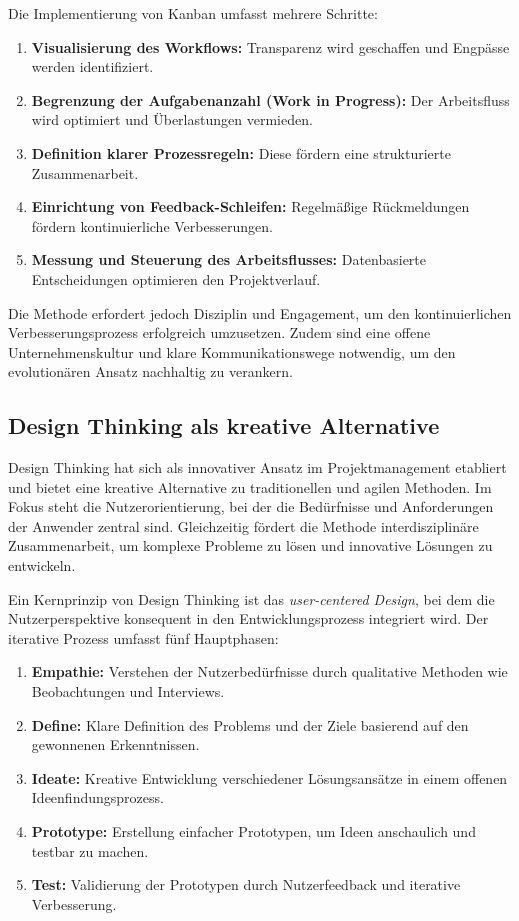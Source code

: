 \documentclass[ngerman]{seminarvorlage}
\begin{document}
Die Implementierung von Kanban umfasst mehrere Schritte:
\begin{enumerate}
    \item \textbf{Visualisierung des Workflows:} Transparenz wird geschaffen und Engpässe werden identifiziert.
    \item \textbf{Begrenzung der Aufgabenanzahl (Work in Progress):} Der Arbeitsfluss wird optimiert und Überlastungen vermieden.
    \item \textbf{Definition klarer Prozessregeln:} Diese fördern eine strukturierte Zusammenarbeit.
    \item \textbf{Einrichtung von Feedback-Schleifen:} Regelmä\ss{}ige Rückmeldungen fördern kontinuierliche Verbesserungen.
    \item \textbf{Messung und Steuerung des Arbeitsflusses:} Datenbasierte Entscheidungen optimieren den Projektverlauf.
\end{enumerate}

Die Methode erfordert jedoch Disziplin und Engagement, um den kontinuierlichen Verbesserungsprozess erfolgreich umzusetzen. Zudem sind eine offene Unternehmenskultur und klare Kommunikationswege notwendig, um den evolutionären Ansatz nachhaltig zu verankern.
\cite{schonfeld_warum_2024, bmi_kanban_2020}

\subsection{Design Thinking als kreative Alternative}  
Design Thinking hat sich als innovativer Ansatz im Projektmanagement etabliert und bietet eine kreative Alternative zu traditionellen und agilen Methoden. Im Fokus steht die Nutzerorientierung, bei der die Bedürfnisse und Anforderungen der Anwender zentral sind. Gleichzeitig fördert die Methode interdisziplinäre Zusammenarbeit, um komplexe Probleme zu lösen und innovative Lösungen zu entwickeln.  

Ein Kernprinzip von Design Thinking ist das \textit{user-centered Design}, bei dem die Nutzerperspektive konsequent in den Entwicklungsprozess integriert wird. Der iterative Prozess umfasst fünf Hauptphasen:  

\begin{enumerate}  
    \item \textbf{Empathie:} Verstehen der Nutzerbedürfnisse durch qualitative Methoden wie Beobachtungen und Interviews.  
    \item \textbf{Define:} Klare Definition des Problems und der Ziele basierend auf den gewonnenen Erkenntnissen.  
    \item \textbf{Ideate:} Kreative Entwicklung verschiedener Lösungsansätze in einem offenen Ideenfindungsprozess.  
    \item \textbf{Prototype:} Erstellung einfacher Prototypen, um Ideen anschaulich und testbar zu machen.  
    \item \textbf{Test:} Validierung der Prototypen durch Nutzerfeedback und iterative Verbesserung.  
\end{enumerate}  
\end{document}
